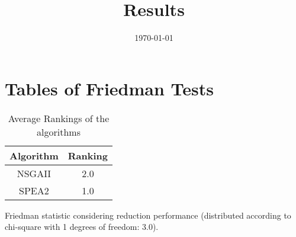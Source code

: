 \documentclass{article}
\title{Results}
\author{}
\date{\today}
\begin{document}
\oddsidemargin 0in \topmargin 0in\maketitle
\section{Tables of Friedman Tests}
\begin{table}[!htp]
\centering
\caption{Average Rankings of the algorithms
}\begin{tabular}{c|c}
Algorithm&Ranking\\
\hline
NSGAII&2.0\\
SPEA2&1.0\\
\end{tabular}
\end{table}


Friedman statistic considering reduction performance (distributed according to chi-square with 1 degrees of freedom: 3.0).
\end{document}

